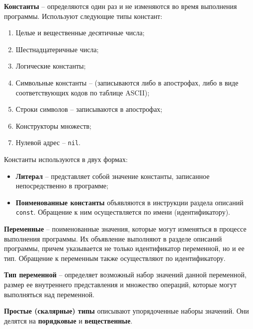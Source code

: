 \begin{myquote}

\end{myquote}

{\bf{Константы}} – определяются один раз и не изменяются во время выполнения программы.
Используют следующие типы констант:
\begin{enumerate}
    \item Целые и вещественные десятичные числа;
    \item Шестнадцатеричные числа;
    \item Логические константы;
    \item Символьные константы – (записываются либо в апострофах, либо в виде соответствующих кодов по таблице ASCII);
    \item Строки символов – записываются в апострофах;
    \item Конструкторы множеств;
    \item Нулевой адрес – \texttt{nil}.
\end{enumerate}

\noindent
Константы используются в двух формах: 
\begin{itemize}
    \item {\bf{Литерал}} – представляет собой значение константы, записанное непосредственно в программе;
    \item {\bf{Поименованные константы}} объявляются в инструкции раздела описаний \texttt{const}. Обращение к ним осуществляется по имени (идентификатору).
\end{itemize}

{\bf{Переменные}} – поименованные значения, которые могут изменяться в процессе выполнения программы. Их объявление выполняют в разделе описаний программы, причем указывается не только идентификатор переменной, но и ее тип. Обращение к переменным также осуществляют по идентификатору.

{\bf{Тип переменной}} – определяет возможный набор значений данной переменной, размер ее внутреннего представления и множество операций, которые могут выполняться над переменной.


{\bf Простые (скалярные) типы} описывают упорядоченные наборы значений. Они делятся на {\bf порядковые} и {\bf вещественные}.




